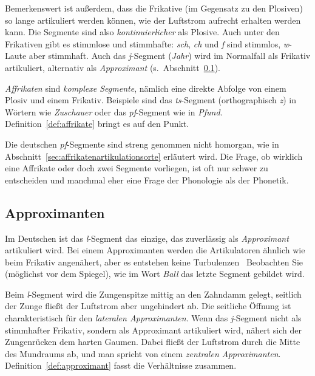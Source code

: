 \Stretch[0.5]

Bemerkenswert ist außerdem, dass die Frikative (im Gegensatz zu den Plosiven) so lange artikuliert werden können, wie der Luftstrom aufrecht erhalten werden kann.
Die Segmente sind also \textit{kontinuierlicher} als Plosive.
Auch unter den Frikativen gibt es stimmlose und stimmhafte: \textit{sch}, \textit{ch} und \textit{f} sind stimmlos, \textit{w}-Laute aber \zB stimmhaft.
Auch das \textit{j}-Segment (\textit{Jahr}) wird im Normalfall als Frikativ artikuliert, alternativ als \textit{Approximant} (s.\ Abschnitt~\ref{sec:lateraleapproximanten}).

\textit{Affrikaten} sind \textit{komplexe Segmente}, nämlich eine direkte Abfolge von einem Plosiv und einem Frikativ.
Beispiele sind das \textit{ts}-Segment (orthographisch \textit{z}) in Wörtern wie \textit{Zuschauer} oder das \textit{pf}-Segment wie in \textit{Pfund}.
Definition~\ref{def:affrikate} bringt es auf den Punkt.

\Stretch[0.5]


\Stretch[0.5]

Die deutschen \textit{pf}-Segmente sind \zB streng genommen nicht homorgan, wie in Abschnitt~\ref{sec:affrikatenartikulationsorte} erläutert wird.
Die Frage, ob wirklich eine Affrikate oder doch zwei Segmente vorliegen, ist oft nur schwer zu entscheiden und manchmal eher eine Frage der Phonologie als der Phonetik.

\subsection{Approximanten}

\label{sec:lateraleapproximanten}

Im Deutschen ist das \textit{l}-Segment das einzige, das zuverlässig als \textit{Approximant} artikuliert wird.
Bei einem Approximanten werden die Artikulatoren ähnlich wie beim Frikativ angenähert, aber es entstehen keine Turbulenzen
\TuBegin~Beobachten Sie (möglichst vor dem Spiegel), wie im Wort \textit{Ball} das letzte Segment gebildet wird.

Beim \textit{l}-Segment wird die Zungenspitze mittig an den Zahndamm gelegt, seitlich der Zunge fließt der Luftstrom aber ungehindert ab.
Die seitliche Öffnung ist charakteristisch für den \textit{lateralen Approximanten}.
Wenn das \textit{j}-Segment nicht als stimmhafter Frikativ, sondern als Approximant artikuliert wird, nähert sich der Zungenrücken dem harten Gaumen.
Dabei fließt der Luftstrom durch die Mitte des Mundraums ab, und man spricht von einem \textit{zentralen Approximanten}.
Definition~\ref{def:approximant} fasst die Verhältnisse zusammen.

